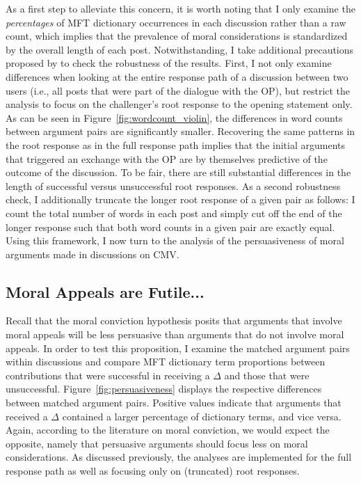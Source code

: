 As a first step to alleviate this concern, it is worth noting that I only examine the \textit{percentages} of MFT dictionary occurrences in each discussion rather than a raw count, which implies that the prevalence of moral considerations is standardized by the overall length of each post. Notwithstanding, I take additional precautions proposed by \citet{tan2016winning} to check the robustness of the results. First, I not only examine differences when looking at the entire response path of a discussion between two users (i.e., all posts that were part of the dialogue with the OP), but restrict the analysis to focus on the challenger's root response to the opening statement only. As can be seen in Figure~\ref{fig:wordcount_violin}, the differences in word counts between argument pairs are significantly smaller. Recovering the same patterns in the root response as in the full response path implies that the initial arguments that triggered an exchange with the OP are by themselves predictive of the outcome of the discussion. To be fair, there are still substantial differences in the length of successful versus unsuccessful root responses. As a second robustness check, I additionally truncate the longer root response of a given pair as follows: I count the total number of words in each post and simply cut off the end of the longer response such that both word counts in a given pair are exactly equal. Using this framework, I now turn to the analysis of the persuasiveness of moral arguments made in discussions on CMV.


\subsection{Moral Appeals are Futile...}

Recall that the moral conviction hypothesis posits that arguments that involve moral appeals will be less persuasive than arguments that do not involve moral appeals. In order to test this proposition, I examine the matched argument pairs within discussions and compare MFT dictionary term proportions between contributions that were successful in receiving a $\Delta$ and those that were unsuccessful. Figure~\ref{fig:persuasiveness} displays the respective differences between matched argument pairs. Positive values indicate that arguments that received a $\Delta$ contained a larger percentage of dictionary terms, and vice versa. Again, according to the literature on moral conviction, we would expect the opposite, namely that persuasive arguments should focus less on moral considerations. As discussed previously, the analyses are implemented for the full response path as well as focusing only on (truncated) root responses.

